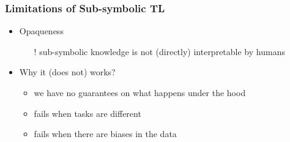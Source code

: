 \documentclass[presentation]{beamer}\mode<presentation>{\usetheme{blackAMSBolognaFC}}
\begin{document}
\begin{frame}%
\frametitle{Limitations of Sub-symbolic TL}

    \begin{itemize}
        \item Opaqueness
        \begin{itemize}
            \item[!] sub-symbolic knowledge is \alert{not} (directly) \alert{interpretable} by humans
        \end{itemize}

        \vfill

        \item Why it (does not) works?
        \begin{itemize}
            \item we have no guarantees on what happens under the hood
            \item fails when tasks are different
            \item fails when there are biases in the data
        \end{itemize}

    \end{itemize}

\end{frame}
\end{document}

